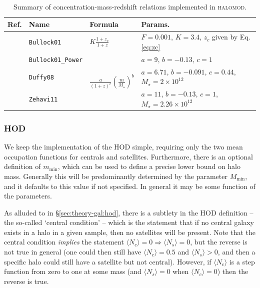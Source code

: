\documentclass[5p]{elsarticle}
\newcommand{\Nc}{\langle N_c \rangle}
\newcommand{\Ns}{\langle N_s \rangle}
\begin{document}
\begin{table}
\centering
\begin{tabu}{X[2l]X[1.5l]X[2l]X[3.5l]}
\toprule[0.05cm] 
Ref. & Name & Formula & Params. \\
\toprule[0.05cm]
      
        \citet{Bullock2001} & \texttt{Bullock01} & $\displaystyle K\frac{1+z_c}{1+z}$ & $F=0.001$, $K=3.4$, $z_c$ given by Eq. \ref{eq:zc} \\ \midrule

        \citet{Bullock2001} & \texttt{Bullock01\_Power} &  & $a=9$, $b=-0.13$, $c=1$ \\

        \citet{Duffy2008} & \texttt{Duffy08} & & $a=6.71$, $b=-0.091$, $c=0.44$, $M_\star=2\times10^{12}$ \\

        \citet{Zehavi2011} & \texttt{Zehavi11} & & $a=11$, $b=-0.13$, $c=1$, $M_\star=2.26\times10^{12}$ \\
        
         \bottomrule[0.05cm]
\end{tabu}
\caption{Summary of concentration-mass-redshift relations implemented in \textsc{halomod}.}
\label{tab:models_concentration}
\end{table}


\subsubsection{HOD}
\label{sec:halomod:components:hod}
We keep the implementation of the HOD simple, requiring only the two mean occupation functions for centrals and satellites. Furthermore, there is an optional definition of $m_\text{min}$, which can be used to define a precise lower bound on halo mass. Generally this will be predominantly determined by the parameter $M_\text{min}$, and it defaults to this value if not specified. In general it may be some function of the parameters.

As alluded to in \S\ref{sec:theory-gal:hod}, there is a subtlety in the HOD definition -- the so-called `central condition' -- which is the statement that if no central galaxy exists in a halo in a given sample, then no satellites will be present. Note that the central condition \textit{implies} the statement $\Nc=0 \Rightarrow \Ns=0$, but the reverse is not true in general (one could then still have $\Nc = 0.5$ and $\Ns > 0$, and then a specific halo could still have a satellite but not central). However, if $\Nc$ is a step function from zero to one at some mass (and $\Ns=0$ when $\Nc=0$) then the reverse is true.
\end{document}
